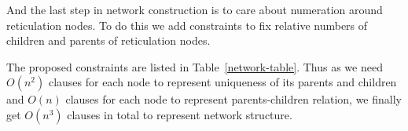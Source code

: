 \documentclass[runningheads, envcountsame, a4paper]{llncs}
\begin{document}
And the last step in network construction is to care about numeration around reticulation nodes. To do this we add constraints to fix 
relative numbers of children and parents of reticulation nodes. 

The proposed constraints are listed in Table~\ref{network-table}. Thus as we need $O(n^2)$ clauses for each node to represent uniqueness of 
its parents and children and $O(n)$ clauses for each node to represent parents-children relation, we finally get $O(n^3)$ clauses in total 
to represent network structure.

\begin{table}
\centering
\caption{Clauses for network structure encoding}
\end{table}
\end{document}
